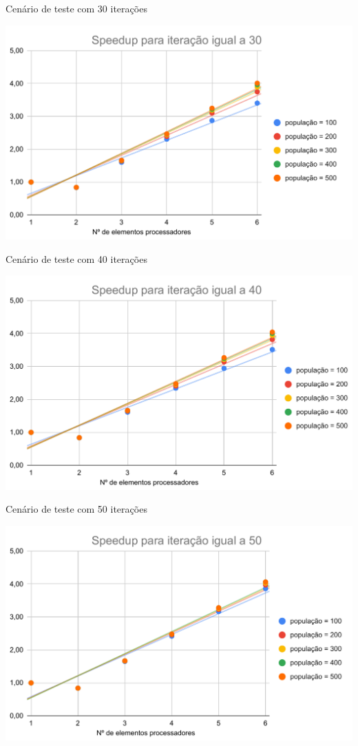 \begin{graph}[h]{16cm}
    \caption{Cenário de teste com 30 iterações}
        \includegraphics[width=14cm]{graficos/Speedup para iteração igual a 30.pdf}
\end{graph}

\begin{graph}[h]{16cm}
    \caption{Cenário de teste com 40 iterações}
        \includegraphics[width=14cm]{graficos/Speedup para iteração igual a 40.pdf}
\end{graph}

\begin{graph}[h]{16cm}
    \caption{Cenário de teste com 50 iterações}
    \includegraphics[width=14cm]{graficos/Speedup para iteração igual a 50.pdf}
\end{graph}

